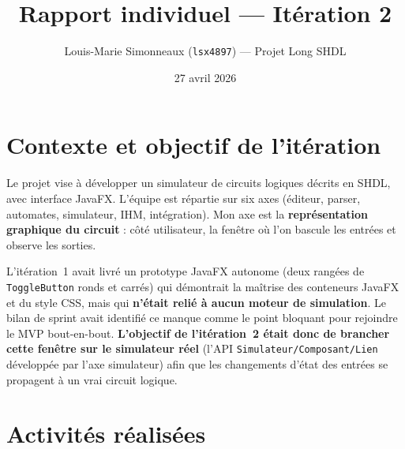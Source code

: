 \documentclass[11pt,a4paper]{article}
\title{\vspace{-1.5cm}Rapport individuel --- It\'eration 2}
\author{Louis-Marie Simonneaux (\texttt{lsx4897}) --- Projet Long SHDL}
\date{27 avril 2026}
\begin{document}
\maketitle
\vspace{-1.5em}

\section*{Contexte et objectif de l'it\'eration}

Le projet vise \`a d\'evelopper un simulateur de circuits logiques d\'ecrits en SHDL, avec interface JavaFX. L'\'equipe est r\'epartie sur six axes (\'editeur, parser, automates, simulateur, IHM, int\'egration). Mon axe est la \textbf{repr\'esentation graphique du circuit} : c\^ot\'e utilisateur, la fen\^etre o\`u l'on bascule les entr\'ees et observe les sorties.

L'it\'eration~1 avait livr\'e un prototype JavaFX autonome (deux rang\'ees de \texttt{ToggleButton} ronds et carr\'es) qui d\'emontrait la ma\^itrise des conteneurs JavaFX et du style CSS, mais qui \textbf{n'\'etait reli\'e \`a aucun moteur de simulation}. Le bilan de sprint avait identifi\'e ce manque comme le point bloquant pour rejoindre le MVP bout-en-bout. \textbf{L'objectif de l'it\'eration~2 \'etait donc de brancher cette fen\^etre sur le simulateur r\'eel} (l'API \texttt{Simulateur/Composant/Lien} d\'evelopp\'ee par l'axe simulateur) afin que les changements d'\'etat des entr\'ees se propagent \`a un vrai circuit logique.

\section*{Activit\'es r\'ealis\'ees}
\end{document}
